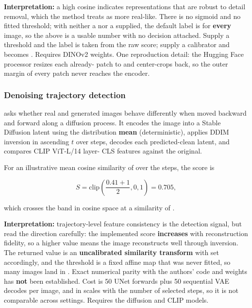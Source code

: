 \textbf{Interpretation:} a high cosine indicates representations that
are robust to detail removal, which the method treats as more real-like.
There is no sigmoid and no fitted threshold; with neither a
\texttt{} nor a \texttt{}
supplied, the default label is \texttt{} for
\textbf{every} image, so the \texttt{} above is a usable
number with no decision attached. Supply a threshold and the label is
taken from the raw score; supply a calibrator and
\texttt{} becomes
\texttt{}. Requires DINOv2 weights.
One reproduction detail: the Hugging Face processor resizes each
already-\texttt{} patch to \texttt{} and
center-crops back, so the outer margin of every patch never reaches the
encoder.

\subsubsection{Denoising trajectory
detection}\label{record-DETECTORS-md-denoising-trajectory-detection}

\texttt{} asks whether real and
generated images behave differently when moved backward and forward
along a diffusion process. It encodes the image into a Stable Diffusion
latent using the distribution \textbf{mean} (deterministic), applies
DDIM inversion in ascending \(t\) over \texttt{} steps,
decodes each predicted-clean latent, and compares CLIP ViT-L/14
layer-\texttt{} CLS features against the original.

For an illustrative mean cosine similarity of \texttt{}
over the \texttt{} steps, the score is

\[
S = \mathrm{clip}\left(\frac{0.41 + 1}{2}, 0, 1\right) = 0.705,
\]

which crosses the \texttt{} band in cosine space at a
similarity of \texttt{}.

\textbf{Interpretation:} trajectory-level feature consistency is the
detection signal, but read the direction carefully: the implemented
score \textbf{increases} with reconstruction fidelity, so a higher value
means the image reconstructs well through inversion. The returned value
is an \textbf{uncalibrated similarity transform} with
\texttt{} set accordingly, and the threshold
is a fixed affine map that was never fitted, so many images land in
\texttt{}. Exact numerical parity with the authors'
code and weights has \textbf{not} been established. Cost is 50 UNet
forwards plus 50 sequential VAE decodes per image, and
\texttt{} in
\texttt{} scales with the number of selected steps, so
it is not comparable across \texttt{}
settings. Requires the diffusion and CLIP models.
